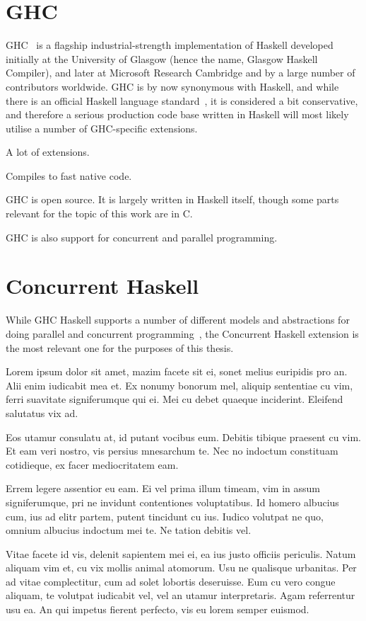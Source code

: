 \documentclass[a4paper,11pt,oneside]{report}
\begin{document}
\section{GHC}

GHC~\cite{bib:ghc} is a flagship industrial-strength implementation of Haskell
developed initially at the University of Glasgow (hence the name, Glasgow
Haskell Compiler), and later at Microsoft Research Cambridge and by a large
number of contributors worldwide. GHC is by now synonymous with Haskell, and
while there is an official Haskell language standard~\cite{bib:haskell2010}, it
is considered a bit conservative, and therefore a serious production code base
written in Haskell will most likely utilise a number of GHC-specific extensions.

A lot of extensions.

Compiles to fast native code.

GHC is open source. It is largely written in Haskell itself, though some parts
relevant for the topic of this work are in C.

GHC is also  support for concurrent and parallel programming.

\section{Concurrent Haskell}

While GHC Haskell supports a number of different models and abstractions for
doing parallel and concurrent programming~\cite{bib:marlow2013}, the Concurrent
Haskell extension is the most relevant one for the purposes of this thesis.

Lorem ipsum dolor sit amet, mazim facete sit ei, sonet melius euripidis pro
an. Alii enim iudicabit mea et. Ex nonumy bonorum mel, aliquip sententiae cu
vim, ferri suavitate signiferumque qui ei. Mei cu debet quaeque
inciderint. Eleifend salutatus vix ad.

Eos utamur consulatu at, id putant vocibus eum. Debitis tibique praesent cu
vim. Et eam veri nostro, vis persius mnesarchum te. Nec no indoctum constituam
cotidieque, ex facer mediocritatem eam.

Errem legere assentior eu eam. Ei vel prima illum timeam, vim in assum
signiferumque, pri ne invidunt contentiones voluptatibus. Id homero albucius
cum, ius ad elitr partem, putent tincidunt cu ius. Iudico volutpat ne quo,
omnium albucius indoctum mei te. Ne tation debitis vel.

Vitae facete id vis, delenit sapientem mei ei, ea ius justo officiis
periculis. Natum aliquam vim et, cu vix mollis animal atomorum. Usu ne qualisque
urbanitas. Per ad vitae complectitur, cum ad solet lobortis deseruisse. Eum cu
vero congue aliquam, te volutpat iudicabit vel, vel an utamur
interpretaris. Agam referrentur usu ea. An qui impetus fierent perfecto, vis eu
lorem semper euismod.
\end{document}
